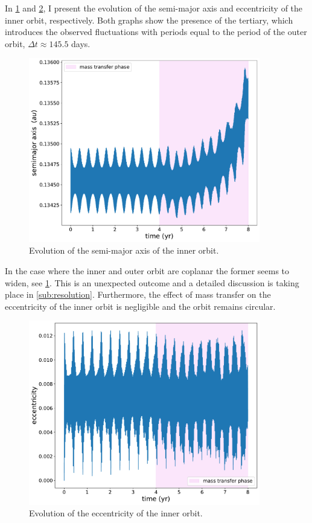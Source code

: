 In \cref{fig:accretion_inc_00_inner_semimajor_axis} and \cref{fig:accretion_inc_00_inner_ecc}, I present the evolution of the semi-major axis and eccentricity of the inner orbit, 
respectively. Both graphs show the presence of the tertiary, which introduces the observed fluctuations with periods equal to the period of the outer orbit, $\Delta t \approx 145.5$ days.
\begin{figure}[H]
    \centering
    \includegraphics[width=0.9\textwidth]{Thesis/graphs/inc_00/accretion_inc_00_inner_semimajor_axis.pdf}
    \caption{Evolution of the semi-major axis of the inner orbit.}
    \label{fig:accretion_inc_00_inner_semimajor_axis}
\end{figure}
In the case where the inner and outer orbit are coplanar the former seems to widen, see \cref{fig:accretion_inc_00_inner_semimajor_axis}. This is an unexpected outcome and a detailed discussion is taking place in \cref{sub:resolution}. Furthermore, the effect of mass transfer on the eccentricity of the inner orbit is negligible and the orbit remains circular. 
\begin{figure}[!htb]
    \centering
    \includegraphics[width=0.9\textwidth]{Thesis/graphs/inc_00/accretion_inc_00_inner_ecc.pdf}
    \caption{Evolution of the eccentricity of the inner orbit.}
    \label{fig:accretion_inc_00_inner_ecc}
\end{figure}


